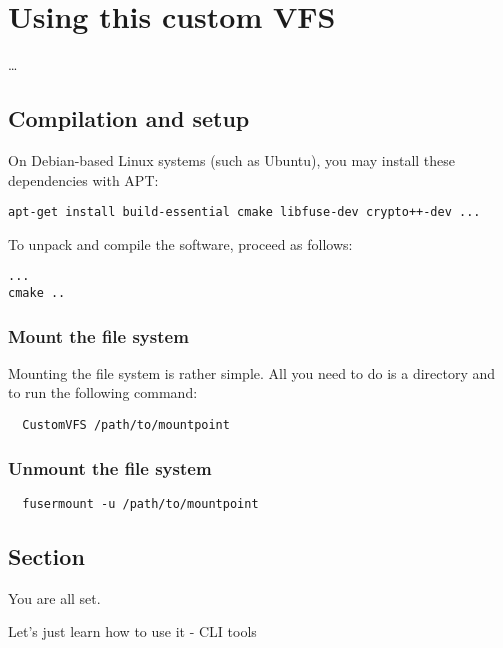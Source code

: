 \chapter{Using this custom VFS}

\ldots

\section*{Compilation and setup}

On Debian-based Linux systems (such as Ubuntu), you may install these dependencies with APT:




\begin{Verbatim}
apt-get install build-essential cmake libfuse-dev crypto++-dev ...
\end{Verbatim}

To unpack and compile the software, proceed as follows:

\begin{Verbatim}
...
cmake ..
\end{Verbatim}

\subsection*{Mount the file system}

Mounting the file system is rather simple.
All you need to do is a directory and to run the following command:

\begin{Verbatim}
  CustomVFS /path/to/mountpoint
\end{Verbatim}


\subsection*{Unmount the file system}

\begin{Verbatim}
  fusermount -u /path/to/mountpoint
\end{Verbatim}

\section*{Section}

You are all set.

Let's just learn how to use it - CLI tools